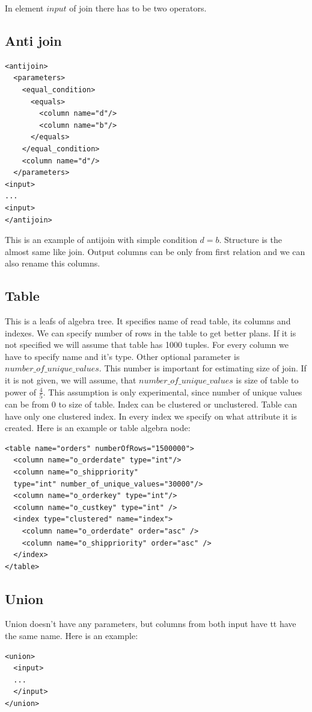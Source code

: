 In element $input$ of join there has to be two operators.

\subsection{Anti join}

\begin{lstlisting}
<antijoin>
  <parameters>
    <equal_condition>
      <equals>
        <column name="d"/>
        <column name="b"/>
      </equals>
    </equal_condition>
    <column name="d"/>
  </parameters>
<input>
...
<input>
</antijoin>
\end{lstlisting}
This is an example of antijoin with simple condition $d=b$. Structure is the almost same like join. Output columns can be only from first relation and we can also rename this columns.

\subsection{Table}
This is a leafs of algebra tree. It specifies name of read table, its columns and indexes. We can specify number of rows in the table to get better plans. If it is not specified we will assume that table has 1000 tuples. For every column we have to specify name and it's type. Other optional parameter is $number\_of\_unique\_values$. This number is important for estimating size of join. If it is not given, we will assume, that $number\_of\_unique\_values$ is size of table to power of $\frac{4}{5}$. This assumption is only experimental, since number of unique values can be from $0$ to size of table. Index can be clustered or unclustered. Table can have only one clustered index. In every index we specify on what attribute it is created. Here is an example or table algebra node:
 
\begin{lstlisting}
<table name="orders" numberOfRows="1500000">
  <column name="o_orderdate" type="int"/>
  <column name="o_shippriority" 
  type="int" number_of_unique_values="30000"/>
  <column name="o_orderkey" type="int"/>
  <column name="o_custkey" type="int" />
  <index type="clustered" name="index">
    <column name="o_orderdate" order="asc" />
    <column name="o_shippriority" order="asc" />
  </index>
</table>
\end{lstlisting}

\subsection{Union}
Union doesn't have any parameters, but columns from both input have tt have the same name. Here is an example:
\begin{lstlisting}
<union>
  <input>
  ...
  </input>
</union>
\end{lstlisting}

